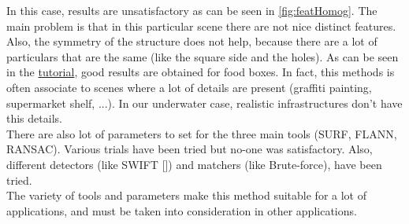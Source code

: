 In this case, results are unsatisfactory as can be seen in \ref{fig:featHomog}. The main problem is that in this particular scene there are not nice distinct features. Also, the symmetry of the structure does not help, because there are a lot of particulars that are the same (like the square side and the holes). As can be seen in the \href{https://docs.opencv.org/3.4/d7/dff/tutorial_feature_homography.html}{tutorial}, good results are obtained for food boxes. In fact, this methods is often associate to scenes where a lot of details are present (graffiti painting, supermarket shelf, ...). In our underwater case, realistic infrastructures don't have this details.\\
There are also lot of parameters to set for the three main tools (SURF, FLANN, RANSAC). Various trials have been tried but no-one was satisfactory. Also, different detectors (like SWIFT [\cite{loweTest}]) and matchers (like Brute-force), have been tried.\\
The variety of tools and parameters make this method suitable for a lot of applications, and must be taken into consideration in other applications.








